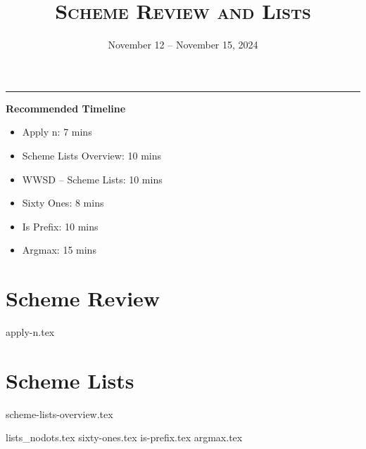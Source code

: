 \documentclass{exam}
\title{\textsc{Scheme Review and Lists}}
\date{November 12 -- November 15, 2024}
\begin{document}
\maketitle
\rule{\textwidth}{0.15em}

\begin{meta} %
    \begin{blocksection}
        \textbf{Recommended Timeline}
        \begin{itemize}
            \item Apply n: 7 mins
            \item Scheme Lists Overview: 10 mins
            \item WWSD -- Scheme Lists: 10 mins
            \item Sixty Ones: 8 mins
            \item Is Prefix: 10 mins
            \item Argmax: 15 mins
        \end{itemize}
    \end{blocksection}
\end{meta}

\section{Scheme Review}
\begin{questions}
 {apply-n.tex}
\end{questions}

\section{Scheme Lists}
{scheme-lists-overview.tex}
\newpage
\begin{questions}
{lists_nodots.tex}
{sixty-ones.tex}
{is-prefix.tex}
\newpage
{argmax.tex} 
\end{questions}
\end{document}
